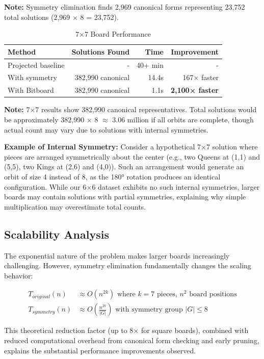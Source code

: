 \documentclass[12pt,a4paper]{article}
\theoremstyle{definition}
\begin{document}
\textbf{Note:} Symmetry elimination finds 2,969 canonical forms representing 23,752 total solutions (2,969 × 8 = 23,752).

\begin{table}[h]
\centering
\caption{7$\times$7 Board Performance}
\begin{tabular}{@{}lrrr@{}}
\toprule
Method & Solutions Found & Time & Improvement \\
\midrule
Projected baseline & - & 40+ min & - \\
With symmetry & 382,990 canonical & 14.4s & 167× faster \\
With Bitboard & 382,990 canonical & 1.1s & \textbf{2,100× faster} \\
\bottomrule
\end{tabular}
\end{table}

\textbf{Note:} 7$\times$7 results show 382,990 canonical representatives. Total solutions would be approximately 382,990 $\times$ 8 $\approx$ 3.06 million if all orbits are complete, though actual count may vary due to solutions with internal symmetries.

\textbf{Example of Internal Symmetry:} Consider a hypothetical 7$\times$7 solution where pieces are arranged symmetrically about the center (e.g., two Queens at (1,1) and (5,5), two Kings at (2,6) and (4,0)). Such an arrangement would generate an orbit of size 4 instead of 8, as the 180° rotation produces an identical configuration. While our 6$\times$6 dataset exhibits no such internal symmetries, larger boards may contain solutions with partial symmetries, explaining why simple multiplication may overestimate total counts.

\subsection{Scalability Analysis}

The exponential nature of the problem makes larger boards increasingly challenging. However, symmetry elimination fundamentally changes the scaling behavior:

\begin{align}
T_{original}(n) &\approx O(n^{2k}) \text{ where } k = 7 \text{ pieces, } n^2 \text{ board positions} \\
T_{symmetry}(n) &\approx O\left(\frac{n^{2k}}{|G|}\right) \text{ with symmetry group } |G| \leq 8
\end{align}

This theoretical reduction factor (up to 8× for square boards), combined with reduced computational overhead from canonical form checking and early pruning, explains the substantial performance improvements observed.
\end{document}
